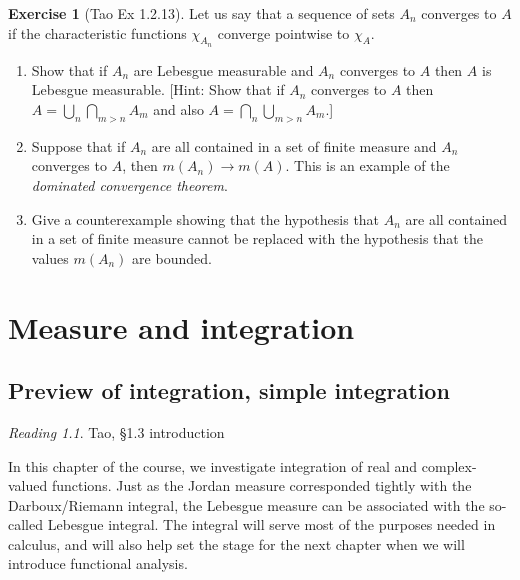 \documentclass[11pt,oneside]{amsbook}
\theoremstyle{definition}
\newtheorem{exerc}{Exercise}[section]
\theoremstyle{plain}
\theoremstyle{definition}
\theoremstyle{remark}
\newtheorem*{reading}{Reading}
\numberwithin{equation}{section}
\numberwithin{figure}{section}
\begin{document}
\begin{exerc}[Tao Ex 1.2.13]
  Let us say that a sequence of sets $A_n$ converges to $A$ if the characteristic functions $\chi_{A_n}$ converge pointwise to $\chi_A$.
  \begin{enumerate}
    \item Show that if $A_n$ are Lebesgue measurable and $A_n$ converges to $A$ then $A$ is Lebesgue measurable. [Hint: Show that if $A_n$ converges to $A$ then $A=\bigcup_n\bigcap_{m>n}A_m$ and also $A=\bigcap_n\bigcup_{m>n}A_m$.]
    \item Suppose that if $A_n$ are all contained in a set of finite measure and $A_n$ converges to $A$, then $m(A_n)\to m(A)$. This is an example of the \emph{dominated convergence theorem}.
    \item Give a counterexample showing that the hypothesis that $A_n$ are all contained in a set of finite measure cannot be replaced with the hypothesis that the values $m(A_n)$ are bounded.
  \end{enumerate}
\end{exerc}

\chapter{Measure and integration}

\section{Preview of integration, simple integration}


\begin{reading}
  Tao, \S 1.3 introduction
\end{reading}

In this chapter of the course, we investigate integration of real and complex-valued functions. Just as the Jordan measure corresponded tightly with the Darboux/Riemann integral, the Lebesgue measure can be associated with the so-called Lebesgue integral. The integral will serve most of the purposes needed in calculus, and will also help set the stage for the next chapter when we will introduce functional analysis.
\end{document}
